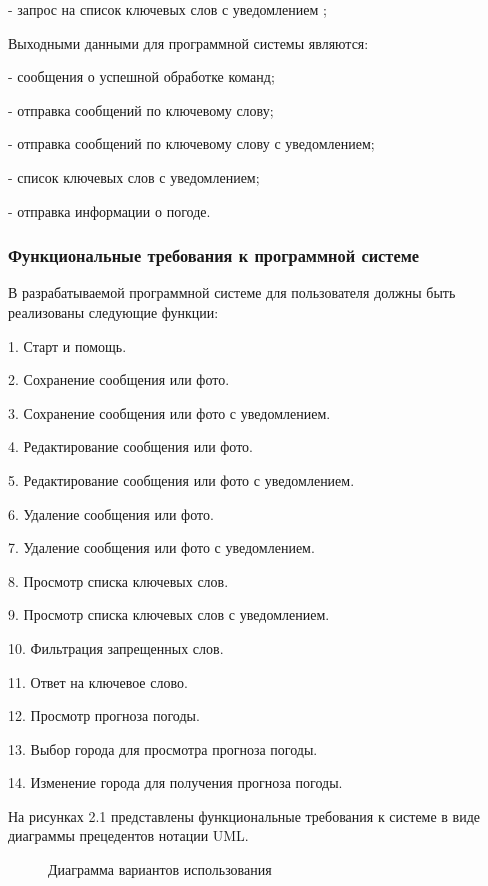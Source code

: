 -	запрос на список ключевых слов с уведомлением ;

Выходными данными для программной системы являются:

-	сообщения о успешной обработке команд;

-	отправка сообщений по ключевому слову;

-	отправка сообщений по ключевому слову с уведомлением;

-	список ключевых слов с уведомлением;

-	отправка информации о погоде.



\subsubsection{Функциональные требования к программной системе}

В разрабатываемой программной системе для пользователя должны быть реализованы следующие функции:

1.	Старт и помощь.

2.	Сохранение сообщения или фото.

3.	Сохранение сообщения или фото с уведомлением.

4.	Редактирование сообщения или фото.

5.	Редактирование сообщения или фото с уведомлением.

6.	Удаление сообщения или фото.

7.	Удаление сообщения или фото с уведомлением.

8.	Просмотр списка ключевых слов.

9.	Просмотр списка ключевых слов с уведомлением.

10.	Фильтрация запрещенных слов.

11.	Ответ на ключевое слово.

12.	Просмотр прогноза погоды.

13.	Выбор города для просмотра прогноза погоды.

14.	Изменение города для получения прогноза погоды.

На рисунках 2.1 представлены функциональные требования к системе в виде диаграммы прецедентов нотации UML.


\begin{figure}
	\center{\texttt{[image: un3]}}
	\caption{Диаграмма вариантов использования}
	\label{un3:image}
\end{figure}
\vspace{-\figureaboveskip} %

